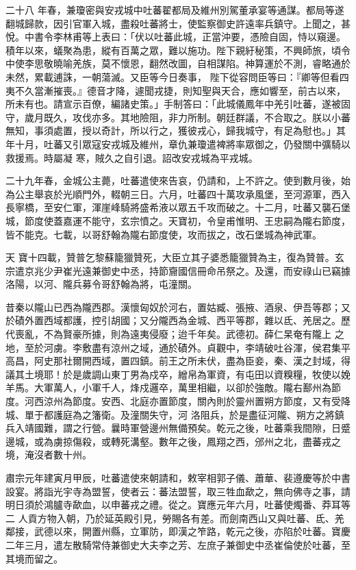 \begin{pinyinscope}
 二十八
 年春，兼瓊密與安戎城中吐蕃翟都局及維州別駕董承宴等通謀。都局等遂翻城歸款，因引官軍入城，盡殺吐蕃將士，使監察御史許遠率兵鎮守。上聞之，甚悅。中書令李林甫等上表曰：「伏以吐蕃此城，正當沖要，憑險自固，恃以窺邊。積年以來，蟻聚為患，縱有百萬之眾，難以施功。陛下親紆秘策，不興師旅，頃令中使李思敬曉喻羌族，莫不懷恩，翻然改圖，自相謀陷。神算運於不測，睿略通於未然，累載逋誅，一朝蕩滅。又臣等今日奏事，
 陛下從容問臣等曰：『卿等但看四夷不久當漸摧喪。』德音才降，遽聞戎捷，則知聖與天合，應如響至，前古以來，所未有也。請宣示百僚，編諸史策。」手制答曰：「此城儀鳳年中羌引吐蕃，遂被固守，歲月既久，攻伐亦多。其地險阻，非力所制。朝廷群議，不合取之。朕以小蕃無知，事須處置，授以奇計，所以行之，獲彼戎心，歸我城守，有足為慰也。」其年十月，吐蕃又引眾寇安戎城及維州，章仇兼瓊遣裨將率眾御之，仍發關中彍騎以救援焉。時屬凝
 寒，賊久之自引退。詔改安戎城為平戎城。



 二十九年春，金城公主薨，吐蕃遣使來告哀，仍請和，上不許之。使到數月後，始為公主舉哀於光順門外，輟朝三日。六月，吐蕃四十萬攻承風堡，至河源軍，西入長寧橋，至安仁軍，渾崖峰騎將盛希液以眾五千攻而破之。十二月，吐蕃又襲石堡城，節度使蓋嘉運不能守，玄宗憤之。天寶初，令皇甫惟明、王忠嗣為隴右節度，皆不能克。七載，以哥舒翰為隴右節度使，攻而拔之，改石堡城為神武軍。



 天
 寶十四載，贊普乞黎蘇籠獵贊死，大臣立其子婆悉籠獵贊為主，復為贊普。玄宗遣京兆少尹崔光遠兼御史中丞，持節齎國信冊命吊祭之。及還，而安祿山已竊據洛陽，以河、隴兵募令哥舒翰為將，屯潼關。



 昔秦以隴山已西為隴西郡。漢懷匈奴於河右，置姑臧、張掖、酒泉、伊吾等郡；又於磧外置西域都護，控引胡國；又分隴西為金城、西平等郡，雜以氐、羌居之。歷代喪亂，不為賢豪所據，則為遠夷侵廢；迨千年矣。武德初。薛仁杲奄有隴上
 之地，至於河虜。李敷盡有涼州之域，通於磧外。貞觀中，李靖破吐谷渾，侯君集平高昌，阿史那社爾開西域，置四鎮。前王之所未伏，盡為臣妾，秦、漢之封域，得議其土境耶！於是歲調山東丁男為戍卒，繒帛為軍資，有屯田以資糗糧，牧使以娩羊馬。大軍萬人，小軍千人，烽戍邏卒，萬里相繼，以卻於強敵。隴右鄯州為節度。河西涼州為節度。安西、北庭亦置節度，關內則於靈州置朔方節度，又有受降城、單于都護庭為之籓衛。及潼關失守，河
 洛阻兵，於是盡征河隴、朔方之將鎮兵入靖國難，謂之行營。曩時軍營邊州無備預矣。乾元之後，吐蕃乘我間隙，日蹙邊城，或為虜掠傷殺，或轉死溝壑。數年之後，鳳翔之西，邠州之北，盡蕃戎之境，淹沒者數十州。



 肅宗元年建寅月甲辰，吐蕃遣使來朝請和，敕宰相郭子儀、蕭華、裴遵慶等於中書設宴。將詣光宇寺為盟誓，使者云：蕃法盟誓，取三牲血歃之，無向佛寺之事，請明日須於鴻臚寺歃血，以申蕃戎之禮。從之。寶應元年六月，吐蕃使燭番、莽耳等二
 人貢方物入朝，乃於延英殿引見，勞賜各有差。而劍南西山又與吐蕃、氐、羌鄰接，武德以來，開置州縣，立軍防，即漢之笮路，乾元之後，亦陷於吐蕃。寶慶二年三月，遣左散騎常侍兼御史大夫李之芳、左庶子兼御史中丞崔倫使於吐蕃，至其境而留之。




\end{pinyinscope}
